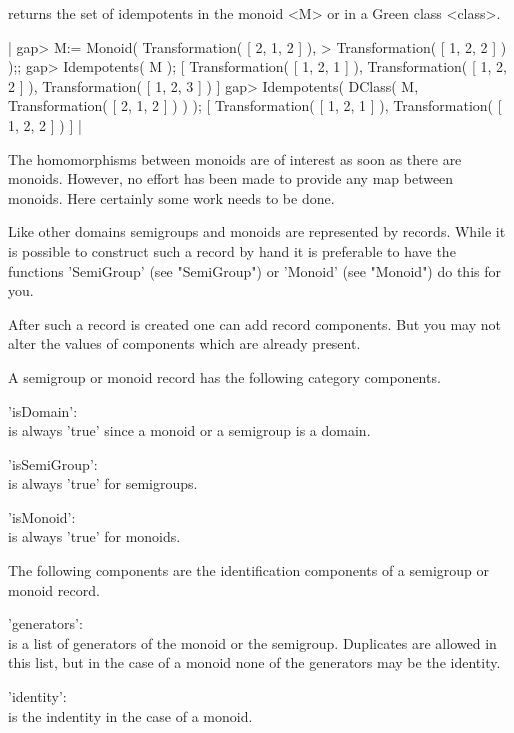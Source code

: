 returns  the set of  idempotents  in the monoid <M>  or  in a Green class
<class>.

|    gap> M:= Monoid( Transformation( [ 2, 1, 2 ] ),
    > Transformation( [ 1, 2, 2 ] ) );;
    gap> Idempotents( M );
    [ Transformation( [ 1, 2, 1 ] ), Transformation( [ 1, 2, 2 ] ), 
      Transformation( [ 1, 2, 3 ] ) ] 
    gap> Idempotents( DClass( M, Transformation( [ 2, 1, 2 ] ) ) );
    [ Transformation( [ 1, 2, 1 ] ), Transformation( [ 1, 2, 2 ] ) ] |

%

The homomorphisms between monoids  are of interest  as soon as  there are
monoids.  However, no effort  has been  made to  provide any map  between
monoids.  Here certainly some work needs to be done.


Like  other domains  semigroups and monoids  are  represented by records. 
While it is possible to construct such a  record by hand it is preferable
to have  the  functions 'SemiGroup'  (see "SemiGroup")  or  'Monoid' (see
"Monoid") do this for you.

After such  a record is  created one can add  record components.  But you
may not alter the values of components which are already present.

A semigroup or monoid record has the following category components.

'isDomain': \\
        is always 'true' since a monoid or a semigroup is a domain.

'isSemiGroup':\\
        is always 'true' for semigroups.

'isMonoid': \\
        is always 'true' for monoids.
        
The following components are the identification components of a semigroup
or monoid record.

'generators': \\
        is   a  list of  generators  of   the monoid  or   the semigroup. 
        Duplicates are allowed in this list, but in  the case of a monoid
        none of the generators may be the identity.

'identity': \\
        is the indentity in the case of a monoid.


